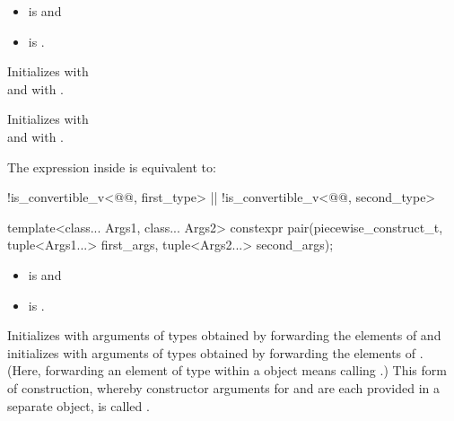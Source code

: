 \documentclass{wg21}
\begin{document}
\begin{itemdescr}
    \pnum
    \constraints
    \begin{itemize}
        \item {} is  and
        \item {} is .
    \end{itemize}

    \pnum
    \effects
    \begin{removedblock}
        Initializes  with
        \\
        and  with
        .
    \end{removedblock}

    \begin{addedblock}
        Initializes  with \\
        and  with .
    \end{addedblock}

    \pnum
    \remarks
    The expression inside  is equivalent to:
    \begin{codeblock}
        !is_convertible_v<@@, first_type>
        || !is_convertible_v<@@, second_type>
    \end{codeblock}
\end{itemdescr}

%
\begin{itemdecl}
    template<class... Args1, class... Args2>
    constexpr pair(piecewise_construct_t,
    tuple<Args1...> first_args, tuple<Args2...> second_args);
\end{itemdecl}

\begin{itemdescr}
    \pnum
    \mandates
    \begin{itemize}
        \item {} is  and
        \item {} is .
    \end{itemize}

    \pnum
    \effects
    Initializes  with arguments of types
     obtained by forwarding the elements of 
    and initializes  with arguments of types 
    obtained by forwarding the elements of . (Here, forwarding
    an element  of type  within a  object means calling
    .) This form of construction, whereby constructor
    arguments for  and  are each provided in a separate
     object, is called .
\end{itemdescr}
\end{document}
